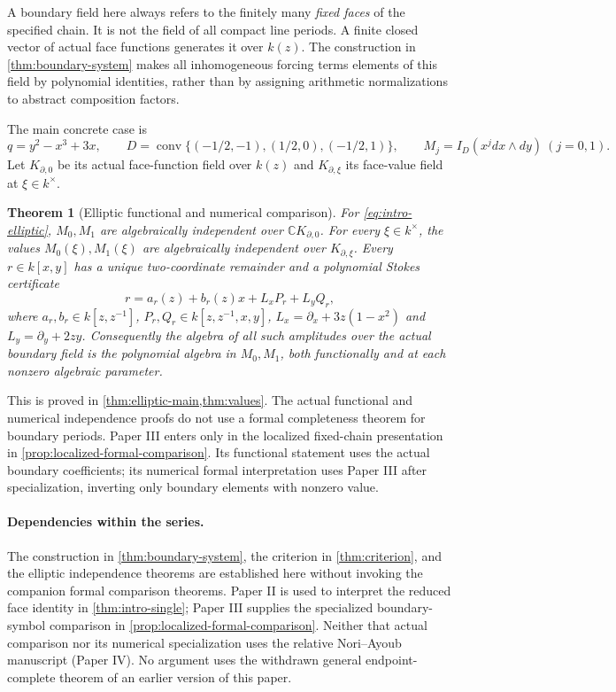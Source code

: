 \documentclass[11pt]{article}
\numberwithin{equation}{section}
\newtheorem{theorem}{Theorem}[section]
\theoremstyle{definition}
\theoremstyle{remark}
\begin{document}
A boundary field here always refers to the finitely many \emph{fixed faces}
of the specified chain. It is not the field of all compact line periods.
A finite closed vector of actual face functions generates it over $k(z)$.
The construction in \cref{thm:boundary-system} makes all inhomogeneous
forcing terms elements of this field by polynomial identities, rather
than by assigning arithmetic normalizations to abstract composition factors.

The main concrete case is
\begin{equation}\label{eq:intro-elliptic}
 q=y^2-x^3+3x,\qquad
 D=\operatorname{conv}\{(-1/2,-1),(1/2,0),(-1/2,1)\},\qquad
 M_j=I_D(x^j dx\wedge dy)\ (j=0,1).
\end{equation}
Let $K_{\partial,0}$ be its actual face-function field over $k(z)$ and
$K_{\partial,\xi}$ its face-value field at $\xi\in k^\times$.

\begin{theorem}[Elliptic functional and numerical comparison]
\label{thm:intro-elliptic}
For \eqref{eq:intro-elliptic}, $M_0,M_1$ are algebraically independent over
$\mathbb C K_{\partial,0}$. For every $\xi\in k^\times$, the values
$M_0(\xi),M_1(\xi)$ are algebraically independent over $K_{\partial,\xi}$.
Every $r\in k[x,y]$ has a unique two-coordinate remainder and a polynomial
Stokes certificate
\[
 r=a_r(z)+b_r(z)x+L_xP_r+L_yQ_r,
\]
where $a_r,b_r\in k[z,z^{-1}]$, $P_r,Q_r\in k[z,z^{-1},x,y]$,
$L_x=\partial_x+3z(1-x^2)$ and $L_y=\partial_y+2zy$.
Consequently the algebra of all such amplitudes over the actual boundary
field is the polynomial algebra in $M_0,M_1$, both functionally and at each
nonzero algebraic parameter.
\end{theorem}

This is proved in \cref{thm:elliptic-main,thm:values}. The actual
functional and numerical independence proofs do not use a formal
completeness theorem for boundary periods. Paper III enters only in the
localized fixed-chain presentation in
\cref{prop:localized-formal-comparison}. Its functional statement uses the
actual boundary coefficients; its numerical formal interpretation uses
Paper III after specialization, inverting only boundary elements with
nonzero value.

\paragraph{Dependencies within the series.}
The construction in \cref{thm:boundary-system}, the criterion in
\cref{thm:criterion}, and the elliptic independence theorems are established
here without invoking the companion formal comparison theorems. Paper II
is used to interpret the reduced face identity in
\cref{thm:intro-single}; Paper III supplies the specialized boundary-symbol
comparison in \cref{prop:localized-formal-comparison}. Neither that actual
comparison nor its numerical specialization uses the relative Nori--Ayoub
manuscript (Paper IV). No argument uses the withdrawn general
endpoint-complete theorem of an earlier version of this paper.
\end{document}
